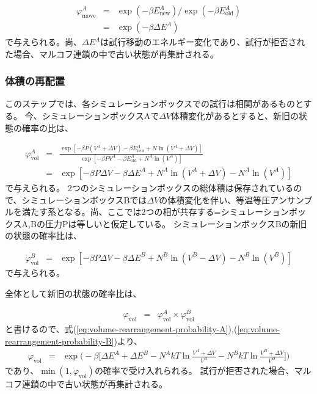 \documentclass[titlepage]{jsreport}
\begin{document}
\large
\begin{eqnarray}
\varphi_\mathrm{move}^A &=& \exp(-{\beta}E_\mathrm{new}^A)/\exp(-{\beta}E_\mathrm{old}^A) \nonumber\\
                 &=& \exp(-{\beta}{\Delta}E^A)\label{eq:particle-displacement-probability}
\end{eqnarray}
\normalsize
で与えられる。尚、${\Delta}E^A$は試行移動のエネルギー変化であり、試行が拒否された場合、マルコフ連鎖の中で古い状態が再集計される。

\subsubsection{体積の再配置}\label{principle-subsubsec:volume-rearrangement}
このステップでは、各シミュレーションボックスでの試行は相関があるものとする。
今、シミュレーションボックスAで$\Delta{V}$体積変化があるとすると、新旧の状態の確率の比は、

\large
\begin{eqnarray}
\varphi_\mathrm{vol}^A &=& \frac{\exp[-{\beta}P(V^A+{\Delta}V)-{\beta}E^A_\mathrm{new}+N\ln(V^A+{\Delta}V)]}{\exp[-{\beta}PV^A-{\beta}E^A_\mathrm{old}+N^A\ln(V^A)]} \nonumber\\
                &=& \exp[-{\beta}P{\Delta}V-{\beta}{\Delta}E^A+N^A\ln(V^A+{\Delta}V)-N^A\ln(V^A)]\label{eq:volume-rearrangement-probability-A}
\end{eqnarray}
\normalsize
で与えられる。
2つのシミュレーションボックスの総体積は保存されているので、シミュレーションボックスBでは${\Delta}V$の体積変化を伴い、等温等圧アンサンブルを満たす系となる。尚、ここでは2つの相が共存する=シミュレーションボックスA,Bの圧力Pは等しいと仮定している。
シミュレーションボックスBの新旧の状態の確率比は、

\large
\begin{eqnarray}
\varphi_\mathrm{vol}^B &=& \exp[-{\beta}P{\Delta}V-{\beta}{\Delta}E^B+N^B\ln(V^B-{\Delta}V)-N^B\ln(V^B)]\label{eq:volume-rearrangement-probability-B}
\end{eqnarray}
\normalsize
で与えられる。

全体として新旧の状態の確率比は、

\large
\begin{eqnarray}
\varphi_\mathrm{vol} &=& \varphi_\mathrm{vol}^A×\varphi_\mathrm{vol}^B \nonumber
\end{eqnarray}
\normalsize
と書けるので、式(\ref{eq:volume-rearrangement-probability-A}),(\ref{eq:volume-rearrangement-probability-B})より、
\large
\begin{eqnarray}
\varphi_\mathrm{vol} &=& \exp\Bigg(-\beta\bigg[{\Delta}E^A+{\Delta}E^B-N^{A}kT\ln{\frac{V^A+\Delta{V}}{V^A}}-N^{B}kT\ln{\frac{V^B+\Delta{V}}{V^B}}\bigg]\Bigg) \label{eq:volume-rearrangement-probability-all}
\end{eqnarray}
であり、$\min(1, \varphi_\mathrm{vol})$の確率で受け入れられる。
試行が拒否された場合、マルコフ連鎖の中で古い状態が再集計される。
\end{document}
